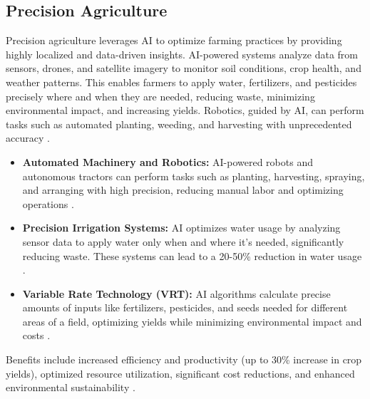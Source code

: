 \subsection{Precision Agriculture}
Precision agriculture leverages AI to optimize farming practices by providing highly localized and data-driven insights. AI-powered systems analyze data from sensors, drones, and satellite imagery to monitor soil conditions, crop health, and weather patterns. This enables farmers to apply water, fertilizers, and pesticides precisely where and when they are needed, reducing waste, minimizing environmental impact, and increasing yields. Robotics, guided by AI, can perform tasks such as automated planting, weeding, and harvesting with unprecedented accuracy \cite{subedi2023ai}.
\begin{itemize}
    \item \textbf{Automated Machinery and Robotics:} AI-powered robots and autonomous tractors can perform tasks such as planting, harvesting, spraying, and arranging with high precision, reducing manual labor and optimizing operations \cite{ZettaFarms_PrecisionAg, NovusASI_PrecisionAg}.
    \item \textbf{Precision Irrigation Systems:} AI optimizes water usage by analyzing sensor data to apply water only when and where it's needed, significantly reducing waste. These systems can lead to a 20-50\% reduction in water usage \cite{Codiant_PrecisionAg, Farmonaut_PrecisionAg}.
    \item \textbf{Variable Rate Technology (VRT):} AI algorithms calculate precise amounts of inputs like fertilizers, pesticides, and seeds needed for different areas of a field, optimizing yields while minimizing environmental impact and costs \cite{Keymakr_PrecisionAg}.
\end{itemize}
Benefits include increased efficiency and productivity (up to 30\% increase in crop yields), optimized resource utilization, significant cost reductions, and enhanced environmental sustainability \cite{Geopard_PrecisionAg, Farmonaut_PrecisionAg_2}.

